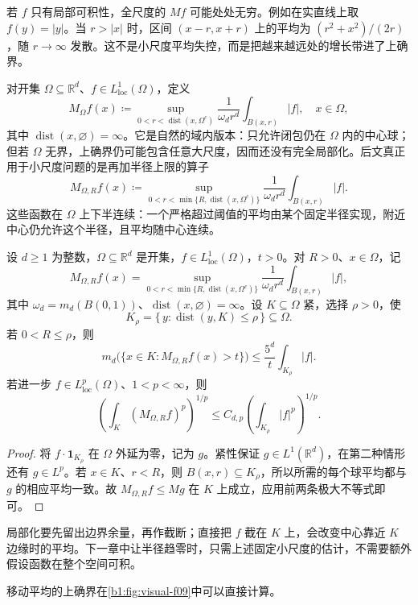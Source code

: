 若 \(f\) 只有局部可积性，全尺度的 \(Mf\) 可能处处无穷。例如在实直线上取 \(f(y)=|y|\)。当 \(r>|x|\) 时，区间 \((x-r,x+r)\) 上的平均为 \((r^2+x^2)/(2r)\)，随 \(r\to\infty\) 发散。这不是小尺度平均失控，而是把越来越远处的增长带进了上确界。

\ProseParagraphBreak

对开集 \(\Omega\subseteq\mathbb R^d\)、\(f\in L^1_{\mathrm{loc}}(\Omega)\)，定义
\[
 M_\Omega f(x)\coloneqq\sup_{0<r<\operatorname{dist}(x,\Omega^c)}
       \frac1{\omega_dr^d}\int_{B(x,r)}|f|,\quad x\in\Omega,
\]
其中 \(\operatorname{dist}(x,\varnothing)=\infty\)。它是自然的域内版本：只允许闭包仍在 \(\Omega\) 内的中心球；但若 \(\Omega\) 无界，上确界仍可能包含任意大尺度，因而还没有完全局部化。后文真正用于小尺度问题的是再加半径上限的算子
\[
 M_{\Omega,R}f(x)\coloneqq\sup_{0<r<\min\{R,\operatorname{dist}(x,\Omega^c)\}}
       \frac1{\omega_dr^d}\int_{B(x,r)}|f|.
\]
这些函数在 \(\Omega\) 上下半连续：一个严格超过阈值的平均由某个固定半径实现，附近中心仍允许这个半径，且平均随中心连续。

\begin{proposition}\label{b1:prop:local-maximal-bound}
设 \(d\ge1\) 为整数，\(\Omega\subseteq\mathbb R^d\) 是开集，\(f\in L^1_{\mathrm{loc}}(\Omega)\)，\(t>0\)。对 \(R>0\)、\(x\in\Omega\)，记
\[
 M_{\Omega,R}f(x)=
 \sup_{0<r<\min\{R,\operatorname{dist}(x,\Omega^c)\}}
       \frac1{\omega_dr^d}\int_{B(x,r)}|f|,
\]
其中 \(\omega_d=m_d(B(0,1))\)、\(\operatorname{dist}(x,\varnothing)=\infty\)。设 \(K\subseteq\Omega\) 紧，选择 \(\rho>0\)，使
\[
 K_\rho=\{\,y:\operatorname{dist}(y,K)\leq\rho\,\}\subseteq\Omega.
\]
若 \(0<R\leq\rho\)，则
\[
 m_d\bigl(\{x\in K:M_{\Omega,R}f(x)>t\}\bigr)
 \leq\frac{5^d}{t}\int_{K_\rho}|f|.
\]
若进一步 \(f\in L^p_{\mathrm{loc}}(\Omega)\)、\(1<p<\infty\)，则
\[
 \left(\int_K(M_{\Omega,R}f)^p\right)^{1/p}
 \leq C_{d,p}\left(\int_{K_\rho}|f|^p\right)^{1/p}.
\]
\end{proposition}
\begin{proof}
将 \(f\cdot\mathbf1_{K_\rho}\) 在 \(\Omega\) 外延为零，记为 \(g\)。紧性保证 \(g\in L^1(\mathbb R^d)\)，在第二种情形还有 \(g\in L^p\)。若 \(x\in K\)、\(r<R\)，则 \(B(x,r)\subseteq K_\rho\)，所以所需的每个球平均都与 \(g\) 的相应平均一致。故 \(M_{\Omega,R}f\leq Mg\) 在 \(K\) 上成立，应用前两条极大不等式即可。
\end{proof}

局部化要先留出边界余量，再作截断；直接把 \(f\) 截在 \(K\) 上，会改变中心靠近 \(K\) 边缘时的平均。下一章中让半径趋零时，只需上述固定小尺度的估计，不需要额外假设函数在整个空间可积。

移动平均的上确界在\cref{b1:fig:visual-f09}中可以直接计算。

